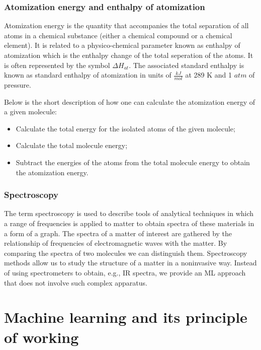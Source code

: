 \documentclass[a4paper,oneside,openright,11pt]{book}
\begin{document}
\subsection{Atomization energy and enthalpy of atomization}

Atomization energy is the quantity that accompanies the total separation of all atoms in a chemical substance (either a chemical compound or a chemical element). It is related to a physico-chemical parameter known as enthalpy of atomization which is the enthalpy change of the total seperation of the atoms. It is often represented by the symbol $\Delta H_{at}$. The associated standard enthalpy is known as standard enthalpy of atomization in units of $\frac{kJ}{mol}$ at 289 K and 1 $atm$ of pressure.

Below is the short description of how one can calculate the atomization energy of a given molecule:

\begin{itemize}
    \item Calculate the total energy for the isolated atoms of the given molecule;
    \item Calculate the total molecule energy;
    \item Subtract the energies of the atoms from the total molecule energy to obtain the atomization energy.
\end{itemize}

\subsection{Spectroscopy}


The term spectroscopy is used to describe tools of analytical techniques in which a range of frequencies is applied to matter to obtain spectra of these materials in a form of a graph. The spectra of a matter of interest are gathered by the relationship of frequencies of electromagnetic waves with the matter. By comparing the spectra of two molecules we can distinguish them. Spectroscopy methods allow us to study the structure of a matter in a noninvasive way. Instead of using spectrometers to obtain, e.g., IR spectra, we provide an ML approach that does not involve such complex apparatus.

\chapter{Machine learning and its principle of working}
\end{document}
